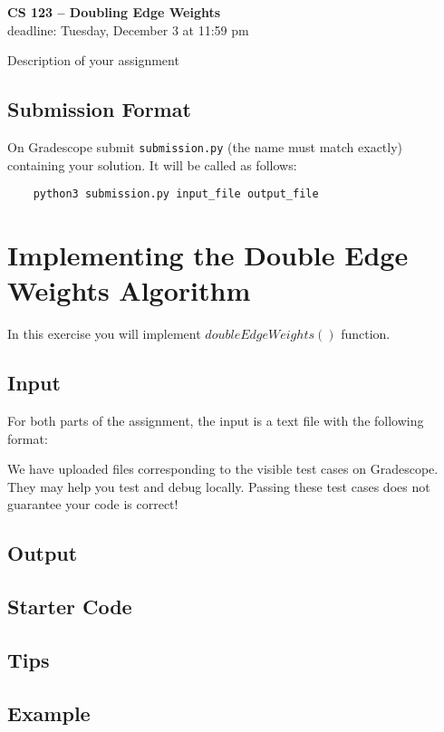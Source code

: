 \documentclass[11pt]{article}
\begin{document}
\begin{center}
\Large{\textbf{CS 123 -- Doubling Edge Weights}}\\
\Large{deadline: Tuesday, December 3 at 11:59 pm}
\end{center}

Description of your assignment
\subsection*{Submission Format}

On Gradescope submit {\tt submission.py}  (the name must match exactly)  containing your solution.
It will be called as follows: 

\begin{verbatim}
	python3 submission.py input_file output_file
\end{verbatim}
\section{Implementing the Double Edge Weights Algorithm}

In this exercise you will implement $doubleEdgeWeights()$ function.

\subsection*{Input}

For both parts of the assignment, the input is a text file with the following format: 

We have uploaded files corresponding to the visible test cases on Gradescope.
They may help you test and debug locally.
Passing these test cases does not guarantee your code is correct!

\subsection*{Output}

\subsection*{Starter Code}

\subsection*{Tips}

\subsection*{Example}
\end{document}
